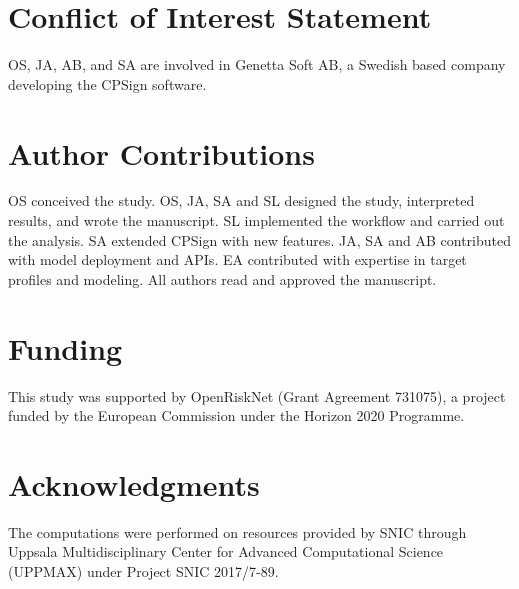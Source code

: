 \documentclass[10pt,article]{memoir}
\begin{document}
\section*{Conflict of Interest Statement}
OS, JA, AB, and SA are involved in Genetta Soft AB, a Swedish based company
developing the CPSign software.


\section*{Author Contributions}
OS conceived the study. OS, JA, SA and SL designed the study, interpreted
results, and wrote the manuscript. SL implemented the workflow and carried out
the analysis. SA extended CPSign with new features. JA, SA and AB contributed
with model deployment and APIs. EA contributed with expertise in target
profiles and modeling. All authors read and approved the manuscript.



\section*{Funding}
This study was supported by OpenRiskNet (Grant Agreement 731075), a project
funded by the European Commission under the Horizon 2020 Programme.

\section*{Acknowledgments}
The computations were performed on resources provided by SNIC through Uppsala
Multidisciplinary Center for Advanced Computational Science (UPPMAX) under
Project SNIC 2017/7-89.

\newpage



\end{document}
